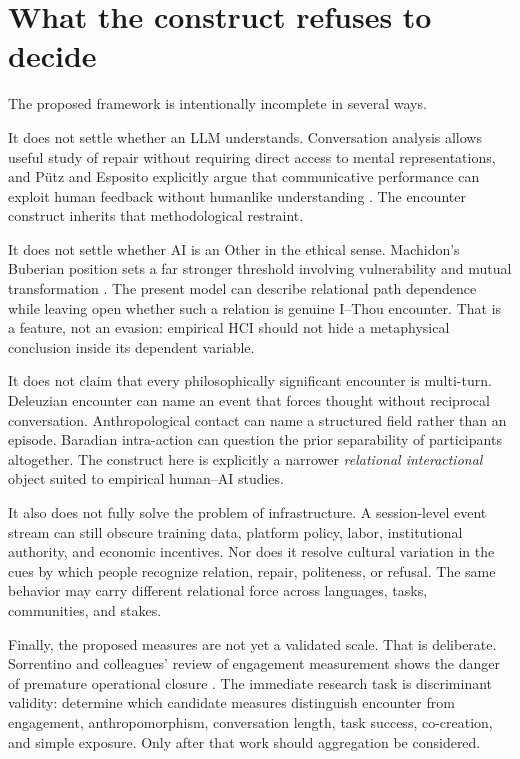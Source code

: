 \documentclass[11pt]{article}
\begin{document}
\section{What the construct refuses to decide}

The proposed framework is intentionally incomplete in several ways.

It does not settle whether an LLM understands. Conversation analysis allows useful study of repair without requiring direct access to mental representations, and P\"utz and Esposito explicitly argue that communicative performance can exploit human feedback without humanlike understanding \citep{PutzEsposito2024Repair}. The encounter construct inherits that methodological restraint.

It does not settle whether AI is an Other in the ethical sense. Machidon's Buberian position sets a far stronger threshold involving vulnerability and mutual transformation \citep{Machidon2026Thou}. The present model can describe relational path dependence while leaving open whether such a relation is genuine I--Thou encounter. That is a feature, not an evasion: empirical HCI should not hide a metaphysical conclusion inside its dependent variable.

It does not claim that every philosophically significant encounter is multi-turn. Deleuzian encounter can name an event that forces thought without reciprocal conversation. Anthropological contact can name a structured field rather than an episode. Baradian intra-action can question the prior separability of participants altogether. The construct here is explicitly a narrower \emph{relational interactional} object suited to empirical human--AI studies.

It also does not fully solve the problem of infrastructure. A session-level event stream can still obscure training data, platform policy, labor, institutional authority, and economic incentives. Nor does it resolve cultural variation in the cues by which people recognize relation, repair, politeness, or refusal. The same behavior may carry different relational force across languages, tasks, communities, and stakes.

Finally, the proposed measures are not yet a validated scale. That is deliberate. Sorrentino and colleagues' review of engagement measurement shows the danger of premature operational closure \citep{SorrentinoEtAl2024Engagement}. The immediate research task is discriminant validity: determine which candidate measures distinguish encounter from engagement, anthropomorphism, conversation length, task success, co-creation, and simple exposure. Only after that work should aggregation be considered.
\end{document}
